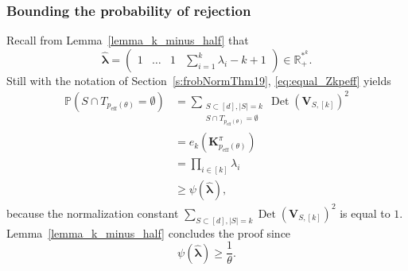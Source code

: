 \documentclass[twoside,11pt]{book}
\numberwithin{theorem}{chapter}
\numberwithin{definition}{chapter}
\numberwithin{proposition}{chapter}
\numberwithin{corollary}{chapter}
\numberwithin{example}{chapter}
\numberwithin{lemma}{chapter}
\numberwithin{assumption}{chapter}
\DeclareMathOperator{\Det}{Det}
\DeclareMathOperator{\eff}{\mathrm{eff}}
\begin{document}
\subsubsection{Bounding the probability of rejection}
Recall from Lemma~\ref{lemma_k_minus_half} that
$$
\hat{\bm{\lambda}} = \begin{pmatrix} 1 &\dots &1&\sum_{i=1}^k {\lambda_i}-k+1\end{pmatrix}\in\mathbb{R}_{+}^{*^{k}}.$$
Still with the notation of Section~\ref{s:frobNormThm19}, \eqref{eq:equal_Zkpeff} yields
\begin{align}
    \mathbb{P}(S \cap T_{p_{\eff}(\theta)} = \emptyset) &= \sum\limits_{\substack{S \subset [d], |S| = k\\ S \cap T_{p_{\eff}(\theta)} = \emptyset}} \Det(\bm{V}_{S,[k]})^{2} \nonumber\\
    &= e_k(\bm{K}^\pi_{p_{\eff}(\theta)})\\
    &= \prod_{i \in [k]}\lambda_{i} \nonumber\\
    &\geq \psi(\hat{\bm{\lambda}}),
\end{align}
because the normalization constant $\displaystyle \sum\limits_{S \subset [d], |S| = k} \Det(\bm{V}_{S,[k]})^{2}$ is equal to $1$.
Lemma~\ref{lemma_k_minus_half} concludes the proof since
\begin{equation}
	\psi(\hat{\bm{\lambda}}) \geq \frac{1}{\theta}.
\end{equation}


\end{document}

